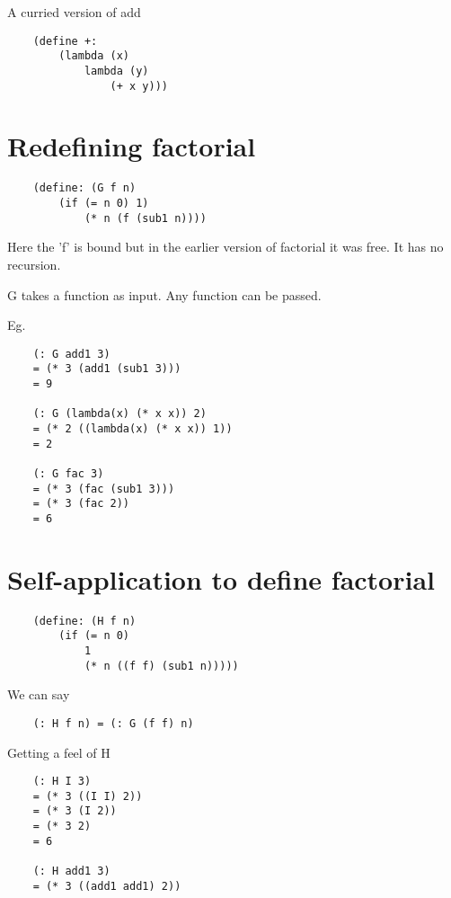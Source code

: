 A curried version of add

\begin{lstlisting}
    (define +:
        (lambda (x)
            lambda (y)
                (+ x y)))
\end{lstlisting}

\section{Redefining factorial}

\begin{lstlisting}
    (define: (G f n)
        (if (= n 0) 1)
            (* n (f (sub1 n))))
\end{lstlisting}

Here the 'f' is bound but in the earlier version of factorial it was free.
It has no recursion.

G takes a function as input. Any function can be passed.

Eg.

\begin{lstlisting}
    (: G add1 3)
    = (* 3 (add1 (sub1 3)))
    = 9

    (: G (lambda(x) (* x x)) 2)
    = (* 2 ((lambda(x) (* x x)) 1))
    = 2

    (: G fac 3)
    = (* 3 (fac (sub1 3)))
    = (* 3 (fac 2))
    = 6
\end{lstlisting}

\section{Self-application to define factorial}

\begin{lstlisting}
    (define: (H f n)
        (if (= n 0)
            1
            (* n ((f f) (sub1 n)))))
\end{lstlisting}

We can say

\begin{lstlisting}
    (: H f n) = (: G (f f) n)
\end{lstlisting}

Getting a feel of H

\begin{lstlisting}
    (: H I 3)
    = (* 3 ((I I) 2))
    = (* 3 (I 2))
    = (* 3 2)
    = 6

    (: H add1 3)
    = (* 3 ((add1 add1) 2))
\end{lstlisting}

